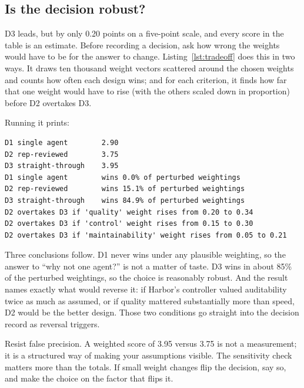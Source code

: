 \subsection{Is the decision robust?}

D3 leads, but by only 0.20 points on a five-point scale, and every score in the table is an estimate. Before recording a decision, ask how wrong the weights would have to be for the answer to change. Listing~\ref{lst:tradeoff} does this in two ways. It draws ten thousand weight vectors scattered around the chosen weights and counts how often each design wins; and for each criterion, it finds how far that one weight would have to rise (with the others scaled down in proportion) before D2 overtakes D3.



Running it prints:
\begin{lstlisting}[language={}, numbers=none, frame=none, xleftmargin=1.5em]
D1 single agent        2.90
D2 rep-reviewed        3.75
D3 straight-through    3.95
D1 single agent        wins 0.0% of perturbed weightings
D2 rep-reviewed        wins 15.1% of perturbed weightings
D3 straight-through    wins 84.9% of perturbed weightings
D2 overtakes D3 if 'quality' weight rises from 0.20 to 0.34
D2 overtakes D3 if 'control' weight rises from 0.15 to 0.30
D2 overtakes D3 if 'maintainability' weight rises from 0.05 to 0.21
\end{lstlisting}

Three conclusions follow. D1 never wins under any plausible weighting, so the answer to ``why not one agent?'' is not a matter of taste. D3 wins in about 85\% of the perturbed weightings, so the choice is reasonably robust. And the result names exactly what would reverse it: if Harbor's controller valued auditability twice as much as assumed, or if quality mattered substantially more than speed, D2 would be the better design. Those two conditions go straight into the decision record as reversal triggers.

\begin{designnote}
Resist false precision. A weighted score of 3.95 versus 3.75 is not a measurement; it is a structured way of making your assumptions visible. The sensitivity check matters more than the totals. If small weight changes flip the decision, say so, and make the choice on the factor that flips it.
\end{designnote}

